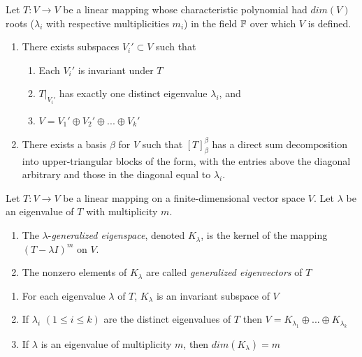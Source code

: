 \documentclass[12pt, a4paper, oneside, openright, titlepage]{book}
\begin{document}
\begin{prop}
    Let $T:V\rightarrow V$ be a linear mapping whose characteristic polynomial had $dim(V)$ roots ($\lambda_i$ with respective multiplicities $m_i$) in the field $\mathbb F$ over which $V$ is defined.
    \begin{enumerate}
        \item There exists subspaces $V_i' \subset V$ such that \begin{enumerate}
            \item Each $V_i'$ is invariant under $T$
            \item $T\rvert_{V_i'}$ has exactly one distinct eigenvalue $\lambda_i$, and 
            \item $V = V_1' \oplus V_2' \oplus ... \oplus V_k'$
        \end{enumerate}
        \item There exists a basis $\beta$ for $V$ such that $[T]_{\beta}^{\beta}$ has a direct sum decomposition into upper-triangular blocks of the form, with the entries above the diagonal arbitrary and those in the diagonal equal to $\lambda_i$.
    \end{enumerate}
\end{prop}

\begin{defn}
    Let $T:V\rightarrow V$ be a linear mapping on a finite-dimensional vector space $V$. Let $\lambda$ be an eigenvalue of $T$ with multiplicity $m$. \begin{enumerate}
        \item The $\lambda$-\emph{generalized eigenspace}, denoted $K_{\lambda}$, is the kernel of the mapping $(T-\lambda I)^m$ on $V$.
        \item The nonzero elements of $K_{\lambda}$ are called \emph{generalized eigenvectors} of $T$
    \end{enumerate}
\end{defn}

\begin{prop}
    \leavevmode
    \begin{enumerate}
        \item For each eigenvalue $\lambda$ of $T$, $K_{\lambda}$ is an invariant subspace of $V$
        \item If $\lambda_i$ $(1\leq i \leq k)$ are the distinct eigenvalues of $T$ then $V = K_{\lambda_1} \oplus ... \oplus K_{\lambda_k}$
        \item If $\lambda$ is an eigenvalue of multiplicity $m$, then $dim(K_{\lambda}) = m$
    \end{enumerate}
\end{prop}
\end{document}
